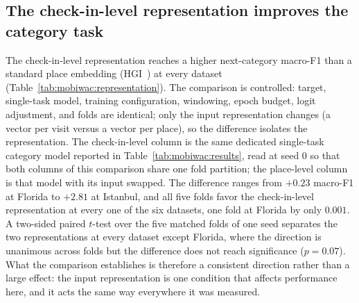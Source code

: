 \subsection{The check-in-level representation improves the category task}
\label{sec:mobiwac:results-part1}
The check-in-level representation reaches a higher next-category macro-F1 than a standard place
embedding (HGI~\cite{huang2023hgi}) at every dataset
(Table~\ref{tab:mobiwac:representation}). The comparison is controlled: target, single-task model, training configuration, windowing, epoch budget, logit adjustment, and folds are identical; only the input representation changes (a vector per visit versus a vector per place), so the difference isolates the representation. The check-in-level column is the same dedicated single-task category model reported in Table~\ref{tab:mobiwac:results}, read at seed 0 so that both columns of this comparison share one fold partition; the place-level column is that model with its input swapped. The difference ranges from $+0.23$ macro-F1 at Florida to
$+2.81$ at Istanbul, and all five folds favor the check-in-level representation at every one of the
six datasets, one fold at Florida by only $0.001$. A two-sided paired $t$-test over the five matched
folds of one seed separates the two representations at every
dataset except Florida, where the direction is unanimous across folds but the difference does not
reach significance ($p=0.07$). What the comparison establishes is therefore a consistent direction
rather than a large effect: the input representation is one condition that affects performance
here, and it acts the same way everywhere it was measured.

